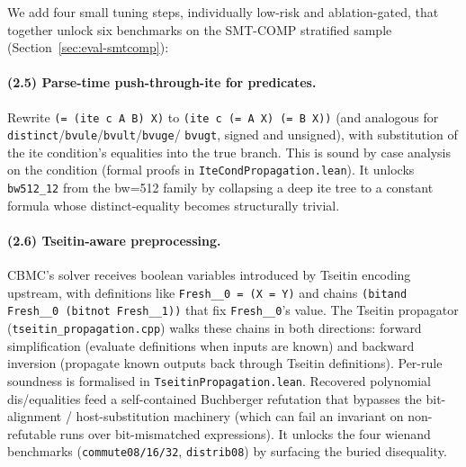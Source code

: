 \documentclass[runningheads]{llncs}
\newcommand{\cbmc}{\textsc{CBMC}\xspace}
\begin{document}
We add four small tuning steps, individually low-risk and
ablation-gated, that together unlock six benchmarks on the
SMT-COMP stratified sample (Section~\ref{sec:eval-smtcomp}):

\paragraph{(2.5) Parse-time push-through-ite for predicates.}
Rewrite \texttt{(= (ite c A B) X)} to
\texttt{(ite c (= A X) (= B X))} (and analogous for
\texttt{distinct}/\texttt{bvule}/\texttt{bvult}/\texttt{bvuge}/
\texttt{bvugt}, signed and unsigned), with substitution of the
ite condition's equalities into the true branch. This is sound
by case analysis on the condition (formal proofs in
\texttt{IteCondPropagation.lean}). It unlocks
\texttt{bw512\_12} from the bw=512 family by collapsing a
deep ite tree to a constant formula whose distinct-equality
becomes structurally trivial.

\paragraph{(2.6) Tseitin-aware preprocessing.}
\cbmc's solver receives boolean variables introduced by
Tseitin encoding upstream, with definitions like
\texttt{Fresh\_\_0 = (X = Y)} and chains
\texttt{(bitand Fresh\_\_0 (bitnot Fresh\_\_1))} that fix
\texttt{Fresh\_\_0}'s value. The Tseitin propagator
(\texttt{tseitin\_propagation.cpp}) walks these chains in both
directions: forward simplification (evaluate definitions when
inputs are known) and backward inversion (propagate known
outputs back through Tseitin definitions). Per-rule soundness
is formalised in \texttt{TseitinPropagation.lean}. Recovered
polynomial dis/equalities feed a self-contained Buchberger
refutation that bypasses the bit-alignment / host-substitution
machinery (which can fail an invariant on
non-refutable runs over bit-mismatched expressions). It
unlocks the four wienand benchmarks
(\texttt{commute08/16/32}, \texttt{distrib08}) by surfacing
the buried disequality.
\end{document}
